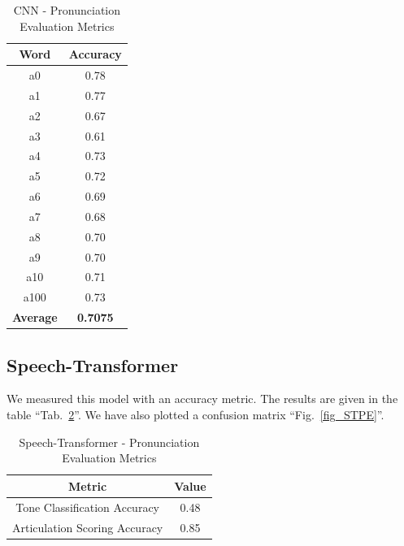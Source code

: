\documentclass[conference]{IEEEtran}
\begin{document}
\begin{table}[hbtp]
    \caption{CNN - Pronunciation Evaluation Metrics}
    \begin{center}
    \begin{tabular}{|c|c|}
    \hline
    \textbf{Word} & {\textbf{Accuracy}} \\
    \hline
    a0 & 0.78 \\
    \hline
    a1 & 0.77 \\
    \hline
    a2 & 0.67 \\
    \hline
    a3 & 0.61 \\
    \hline
    a4 & 0.73 \\
    \hline
    a5 & 0.72 \\
    \hline
    a6 & 0.69 \\
    \hline
    a7 & 0.68 \\
    \hline
    a8 & 0.70 \\
    \hline
    a9 & 0.70 \\
    \hline
    a10 & 0.71 \\
    \hline
    a100 & 0.73 \\
    \hline
    \textbf{Average} & \textbf{0.7075} \\
    \hline
    \end{tabular}
    \label{tab_CNNPE_acc}
    \end{center}
    \end{table}

\subsection{Speech-Transformer}
We measured this model with an accuracy metric. The results are given in the table ``Tab.~\ref{tab_STPE}''. We have also plotted a confusion matrix ``Fig.~\ref{fig_STPE}''.

\begin{table}[hbtp]
\caption{Speech-Transformer - Pronunciation Evaluation Metrics}
\begin{center}
\begin{tabular}{|c|c|}
\hline
\textbf{Metric} & {\textbf{Value}} \\
\hline
Tone Classification Accuracy & 0.48 \\
\hline
Articulation Scoring Accuracy & 0.85 \\
\hline
\end{tabular}
\label{tab_STPE}
\end{center}
\end{table}
\end{document}
